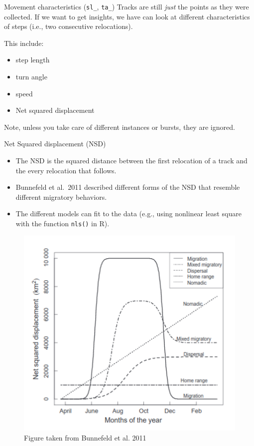 \documentclass[ignorenonframetext,,t]{beamer}
\providecommand{\tightlist}{%
\setlength{\itemsep}{0pt}\setlength{\parskip}{0pt}}
\providecommand{\tightlist}{%
\setlength{\itemsep}{0pt}\setlength{\parskip}{0pt}}
\renewcommand{\tightlist}{\setlength{\itemsep}{1.4ex}\setlength{\parskip}{0pt}}
\begin{document}
\begin{frame}{Movement characteristics (\texttt{sl\_}, \texttt{ta\_})}
\protect\hypertarget{movement-characteristics-sl_-ta_}{}
Tracks are still \emph{just} the points as they were collected. If we
want to get insights, we have can look at different characteristics of
steps (i.e., two consecutive relocations).

This include:

\begin{itemize}
\tightlist
\item
  step length
\item
  turn angle
\item
  speed
\item
  Net squared displacement
\end{itemize}

Note, unless you take care of different instances or bursts, they are
ignored.
\end{frame}

\begin{frame}[fragile]{Net Squared displacement (NSD)}
\protect\hypertarget{net-squared-displacement-nsd}{}
\begin{itemize}
\tightlist
\item
  The NSD is the squared distance between the first relocation of a
  track and the every relocation that follows.
\item
  Bunnefeld et al.~2011 described different forms of the NSD that
  resemble different migratory behaviors.
\item
  The different models can fit to the data (e.g., using nonlinear least
  square with the function \texttt{nls()} in R).
\end{itemize}
\end{frame}

\begin{frame}
\begin{figure}

{\centering \includegraphics[width=0.6\linewidth]{img/nsd} 

}

\caption{Figure taken from Bunnefeld et al. 2011}\label{fig:unnamed-chunk-9}
\end{figure}
\end{frame}
\end{document}
